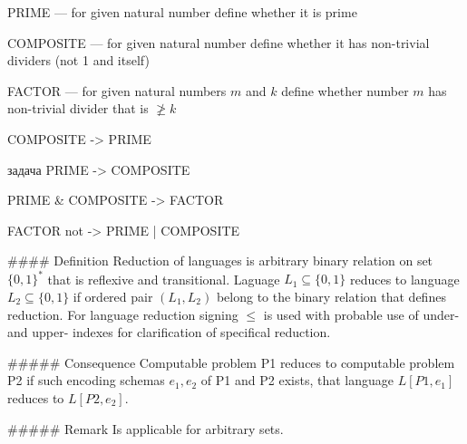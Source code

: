 \documentclass[12pt,letterpaper]{report}
\begin{document}
\item PRIME — for given natural number define whether it is prime
\item COMPOSITE — for given natural number define whether it has non-trivial dividers (not 1 and itself)
\item FACTOR — for given natural numbers $m$ and $k$ define whether number $m$ has non-trivial divider that is $\not\geq k$
\item COMPOSITE -> PRIME
\item задача PRIME -> COMPOSITE
\item PRIME & COMPOSITE -> FACTOR
\item FACTOR not -> PRIME | COMPOSITE

#### Definition
Reduction of languages is arbitrary binary relation on set $\{0,1\}^*$ that is reflexive and transitional. Laguage $L_1 \subseteq \{0,1\}$ reduces to language $L_2 \subseteq \{0,1\}$ if ordered pair $(L_1,L_2)$ belong to the binary relation that defines reduction. For language reduction signing $\leq$ is used with probable use of under- and upper- indexes for clarification of specifical reduction.

##### Consequence
Computable problem P1 reduces to computable problem P2 if such encoding schemas $e_1, e_2$ of P1 and P2 exists, that language $L[P1, e_1]$ reduces to $L[P2, e_2]$.

##### Remark
Is applicable for arbitrary sets.
\end{document}
